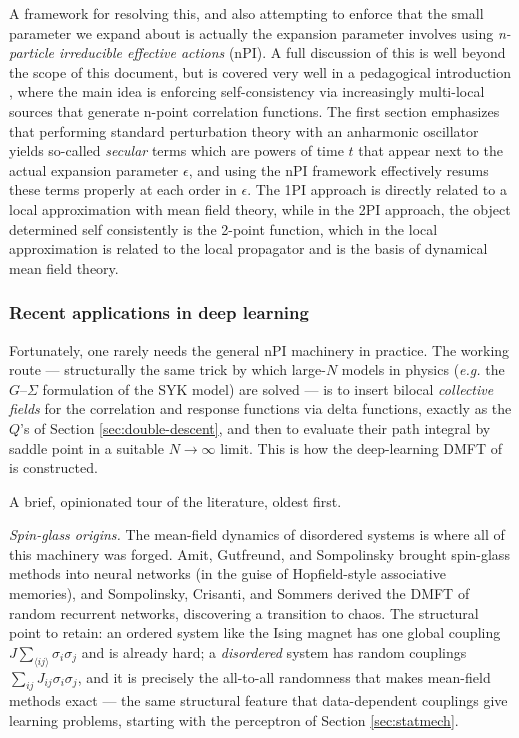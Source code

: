 \documentclass[11pt]{article}
\newcommand{\fixme}[1]{\textcolor{blue}{[#1]}}
\begin{document}
A framework for resolving this, and also attempting to enforce that the small parameter we expand about is actually the expansion parameter involves using \textit{n-particle irreducible effective actions} (nPI).  A full discussion of this is well beyond the scope of this document, but is covered very well in a pedagogical introduction \cite{bergesIntroductionNonequilibriumQuantum2004}, where the main idea is enforcing self-consistency via increasingly multi-local sources that generate n-point correlation functions.  The first section emphasizes that performing standard perturbation theory with an anharmonic oscillator yields so-called \textit{secular} terms which are powers of time $t$ that appear next to the actual expansion parameter $\epsilon$, and using the nPI framework effectively resums these terms properly at each order in $\epsilon$.  The 1PI approach is directly related to a local approximation with mean field theory, while in the 2PI approach, the object determined self consistently is the 2-point function, which in the local approximation is related to the local propagator and is the basis of dynamical mean field theory. 

\subsubsection{Recent applications in deep learning}

Fortunately, one rarely needs the general nPI machinery in practice. The working route --- structurally the same trick by which large-$N$ models in physics (\emph{e.g.} the $G$--$\Sigma$ formulation of the SYK model) are solved --- is to insert bilocal \emph{collective fields} for the correlation and response functions via delta functions, exactly as the $Q$'s of Section \ref{sec:double-descent}, and then to evaluate their path integral by saddle point in a suitable $N\to\infty$ limit. This is how the deep-learning DMFT of \cite{bordelon2022self,bordelon2024dynamical} is constructed. %

A brief, opinionated tour of the literature, oldest first.

\emph{Spin-glass origins.} The mean-field dynamics of disordered systems is where all of this machinery was forged. Amit, Gutfreund, and Sompolinsky \cite{amitSpinglassModelsNeural1985} brought spin-glass methods into neural networks (in the guise of Hopfield-style associative memories), and Sompolinsky, Crisanti, and Sommers \cite{sompolinskyChaosRandomNeural1988} derived the DMFT of random recurrent networks, discovering a transition to chaos. The structural point to retain: an ordered system like the Ising magnet has one global coupling $J\sum_{\langle ij\rangle}\sigma_i\sigma_j$ and is already hard; a \emph{disordered} system has random couplings $\sum_{ij} J_{ij}\sigma_i\sigma_j$, and it is precisely the all-to-all randomness that makes mean-field methods exact --- the same structural feature that data-dependent couplings give learning problems, starting with the perceptron of Section \ref{sec:statmech}.
\end{document}
